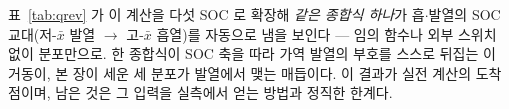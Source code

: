 표~\ref{tab:qrev} 가 이 계산을 다섯 SOC 로 확장해 \emph{같은 종합식 하나}가 흡$\cdot$발열의 SOC 교대(저-$\bar x$
발열 $\to$ 고-$\bar x$ 흡열)를 자동으로 냄을 보인다 --- 임의 함수나 외부 스위치 없이 분포만으로. 한 종합식이
SOC 축을 따라 가역 발열의 부호를 스스로 뒤집는 이 거동이, 본 장이 세운 세 분포가 발열에서 맺는 매듭이다.
이 결과가 실전 계산의 도착점이며, 남은 것은 그 입력을 실측에서 얻는 방법과 정직한 한계다.

